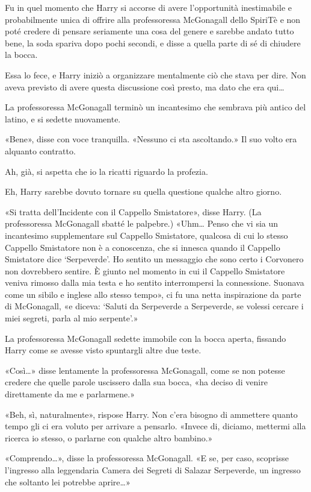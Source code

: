 Fu in quel momento che Harry si accorse di avere l’opportunità inestimabile e probabilmente unica di offrire alla professoressa McGonagall dello SpiriTè e non poté credere di pensare seriamente una cosa del genere e sarebbe andato tutto bene, la soda spariva dopo pochi secondi, e disse a quella parte di sé di chiudere la bocca.

Essa lo fece, e Harry iniziò a organizzare mentalmente ciò che stava per dire. Non aveva previsto di avere questa discussione così presto, ma dato che era qui…

La professoressa McGonagall terminò un incantesimo che sembrava più antico del latino, e si sedette nuovamente.

«Bene», disse con voce tranquilla. «Nessuno ci sta ascoltando.» Il suo volto era alquanto contratto.

Ah, già, si aspetta che io la ricatti riguardo la profezia.

Eh, Harry sarebbe dovuto tornare su quella questione qualche altro giorno.

«Si tratta dell’Incidente con il Cappello Smistatore», disse Harry. (La professoressa McGonagall sbatté le palpebre.) «Uhm… Penso che vi sia un incantesimo supplementare sul Cappello Smistatore, qualcosa di cui lo stesso Cappello Smistatore non è a conoscenza, che si innesca quando il Cappello Smistatore dice ‘Serpeverde’. Ho sentito un messaggio che sono certo i Corvonero non dovrebbero sentire. È giunto nel momento in cui il Cappello Smistatore veniva rimosso dalla mia testa e ho sentito interrompersi la connessione. Suonava come un sibilo e inglese allo stesso tempo», ci fu una netta inspirazione da parte di McGonagall, «e diceva: ‘Saluti da Serpeverde a Serpeverde, se volessi cercare i miei segreti, parla al mio serpente’.»

La professoressa McGonagall sedette immobile con la bocca aperta, fissando Harry come se avesse visto spuntargli altre due teste.

«Così…» disse lentamente la professoressa McGonagall, come se non potesse credere che quelle parole uscissero dalla sua bocca, «ha deciso di venire direttamente da me e parlarmene.»

«Beh, sì, naturalmente», rispose Harry. Non c’era bisogno di ammettere quanto tempo gli ci era voluto per arrivare a pensarlo. «Invece di, diciamo, mettermi alla ricerca io stesso, o parlarne con qualche altro bambino.»

«Comprendo…», disse la professoressa McGonagall. «E se, per caso, scoprisse l’ingresso alla leggendaria Camera dei Segreti di Salazar Serpeverde, un ingresso che soltanto lei potrebbe aprire…»

